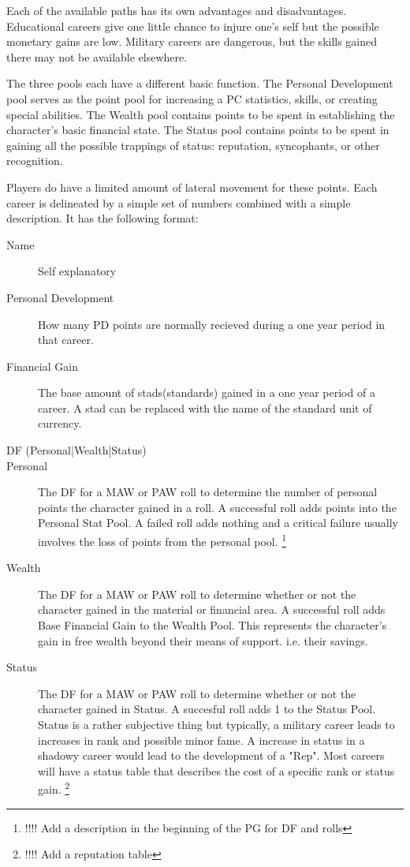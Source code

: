 Each of the available paths has its own advantages and disadvantages.
Educational careers give one little chance to injure one's self but the
possible monetary gains are low.  Military careers are dangerous, but
the skills gained there may not be available elsewhere.

The three pools each have a different basic function.
The Personal Development pool serves as the point pool for
increasing a PC statistics, skills, or creating special abilities.
The Wealth pool contains points to be spent in establishing the
character's basic financial state.
The Status pool contains points to be spent in gaining all the
possible trappings of status: reputation, syncophants, or other recognition.

Players do have a limited amount of lateral movement for these  points.
Each career is delineated by a simple set of numbers combined with a
simple description. It has the following format:

\begin{description}
	\item [Name]
	Self explanatory
    \item[Personal Development]
	How many PD points are normally
	recieved during a one year period in that career.
	\item[Financial Gain]
	The base amount of stads(standards) gained in a one year period of 
	a career. A stad can be replaced with the name of the standard 
	unit of currency.
    \item[DF (Personal|Wealth|Status)]
        \item[Personal]
		The DF for a MAW or PAW roll to determine the number of personal points
		the character gained in a roll. A successful roll adds points into the 
		Personal Stat Pool. A failed roll adds nothing and a critical failure 
        usually involves the loss of points from the personal pool.  
        \footnote{!!!! Add a description in the beginning of the PG for DF and rolls}
        \item[Wealth] The DF for a MAW or PAW
        roll to determine whether or not the character gained in the material 
        or financial area. A successful roll adds Base Financial Gain 
		to the Wealth Pool. This represents the character's gain in free 
		wealth beyond their means of support. i.e. their savings.
        \item[Status] The DF for a MAW or PAW
        roll to determine whether or not the character gained in  
        Status. A succesful roll adds 1 to the Status Pool.
		Status is a rather subjective thing but typically, a 
        military career leads to increases in rank and possible minor fame. A 
        increase in status in a shadowy career would lead to the development 
        of a "Rep".  Most careers will have a status table that describes 
        the cost of a specific rank or status gain. 
		\footnote{!!!! Add a reputation table}
\end{description}

